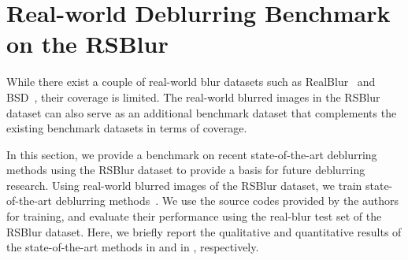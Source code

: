 \section{Real-world Deblurring Benchmark on the RSBlur}
While there exist a couple of real-world blur datasets such as RealBlur~\cite{jsrim-ECCV2020} and BSD~\cite{Zhong_2020_ECCV,Zhong_2021_arxiv},
their coverage is limited.
The real-world blurred images in the RSBlur dataset can also serve as an additional benchmark dataset that complements the existing benchmark datasets in terms of coverage.

In this section, we provide a benchmark on recent state-of-the-art deblurring methods using the RSBlur dataset to provide a basis for future deblurring research.
Using real-world blurred images of the RSBlur dataset, we train state-of-the-art deblurring methods~\cite{Tao-CVPR18,Cho_2021_ICCV,Zamir_2021_CVPR,Zamir_2022_CVPR,Wang_2022_CVPR}.
We use the source codes provided by the authors for training, and evaluate their performance using the real-blur test set of the RSBlur dataset.
Here, we briefly report the qualitative and quantitative results of the state-of-the-art methods in  and in , respectively.

\setlength{\tabcolsep}{4pt}
\begin{table}[t]
\caption{Benchmark of state-of-the-art deblurring methods on the real blurred test set of the RSBlur dataset. We trained all methods using real blurred training set of the RSBlur dataset.}
\label{tbl:deblurring_benchmark}
\centering
{}
\end{table}

